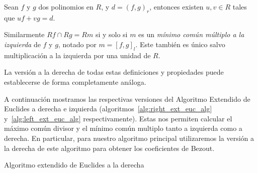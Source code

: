 \begin{proposition}
Sean \(f \text{ y } g\) dos polinomios en \(R\), y  \(d = {( f,g )_r}\), entonces existen \(u, v \in R\) tales que
\(
uf + vg = d
.\)
\end{proposition}
Similarmente  \(Rf \cap Rg = Rm\) si y solo si \(m\) es un \textit{mínimo común múltiplo a la izquierda} de \(f\) y \(g\), notado por \(m = {[f,g]}_l\). Este también es único salvo multiplicación a la izquierda por una unidad de \(R\).

La versión a la derecha de todas estas definiciones y propiedades puede establecerse de forma completamente análoga.

A continuación mostramos las respectivas versiones del Algoritmo Extendido de Euclides a derecha e izquierda (algoritmos~\ref{alg:right_ext_euc_alg} y~\ref{alg:left_ext_euc_alg} respectivamente). Estas nos permiten calcular el máximo común divisor y el mínimo común multiplo tanto a izquierda como a derecha.
En particular, para nuestro algoritmo principal utilizaremos la versión a la derecha de este algoritmo para obtener los coeficientes de Bezout.

\begin{algorithm}[ht]\label{alg:right_ext_euc_alg}
 \caption{Algoritmo extendido de Euclides a la derecha}
\end{algorithm}

